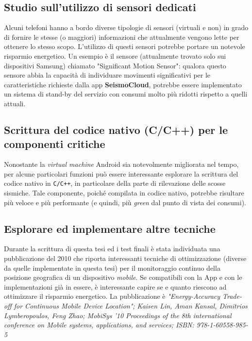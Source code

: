 \documentclass[a4paper,10pt]{memoir}
\begin{document}
\subsection{Studio sull'utilizzo di sensori dedicati}

Alcuni telefoni hanno a bordo diverse tipologie di sensori (virtuali e non) in grado di fornire le stesse (o maggiori) informazioni che attualmente vengono lette per ottenere lo stesso scopo. L'utilizzo di questi sensori potrebbe portare un notevole risparmio energetico. Un esempio è il sensore (attualmente trovato solo sui dispositivi Samsung) chiamato "Significant Motion Sensor": qualora questo sensore abbia la capacità di individuare movimenti significativi per le caratteristiche richieste dalla app \textbf{SeismoCloud}, potrebbe essere implementato un sistema di stand-by del servizio con consumi molto più ridotti rispetto a quelli attuali.

\subsection{Scrittura del codice nativo (C/C++) per le componenti critiche}

Nonostante la \textit{virtual machine} Android sia notevolmente migliorata nel tempo, per alcune particolari funzioni può essere interessante esplorare la scrittura del codice nativo in \texttt{C/C++}, in particolare della parte di rilevazione delle scosse sismiche. Tale componente, poiché compilata in codice nativo, potrebbe risultare più veloce e più performante (e quindi, più \textit{green} dal punto di vista dei consumi).

\subsection{Esplorare ed implementare altre tecniche}

Durante la scrittura di questa tesi ed i test finali è stata individuata una pubblicazione del 2010 che riporta interessanti tecniche di ottimizzazione (diverse da quelle implementate in questa tesi) per il monitoraggio continuo della posizione geografica di un dispositivo \textit{mobile}. Se compatibili con la App e con le implementazioni già in essere, è interessante capire se e quanto riescono ad ottimizzare il risparmio energetico. La pubblicazione è \textit{"Energy-Accuracy Trade-off for Continuous Mobile Device Location"; Kaisen Lin, Aman Kansal, Dimitrios Lymberopoulos, Feng Zhao; MobiSys '10 Proceedings of the 8th international conference on Mobile systems, applications, and services; ISBN: 978-1-60558-985-5}
\end{document}

